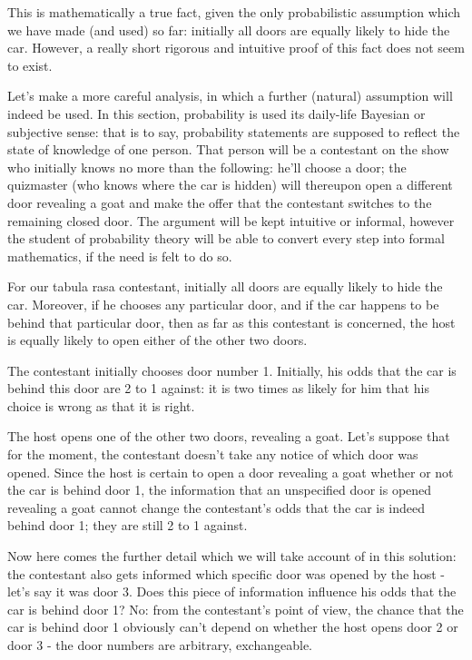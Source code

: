 This is mathematically a true fact, given the only probabilistic assumption which we have made (and used) so far: initially all doors are equally likely to hide the car. However, a really short rigorous and intuitive proof of this fact does not seem to exist.

Let's make a more careful analysis, in which a further (natural) assumption will indeed be used. In this section, probability is used its daily-life Bayesian or subjective sense: that is to say, probability statements are supposed to reflect the state of knowledge of one person. That person will be a contestant on the show who initially knows no more than the following: he'll choose a door; the quizmaster (who knows where the car is hidden) will thereupon open a different door revealing a goat and make the offer that the contestant switches to the remaining closed door. The argument will be kept intuitive or informal, however the student of probability theory will be able to convert every step into formal mathematics, if the need is felt to do so.

For our tabula rasa contestant, initially all doors are equally likely to hide the car. Moreover, if he chooses any particular door, and if the car happens to be behind that particular door, then as far as this contestant is concerned, the host is equally likely to open either of the other two doors.

The contestant initially chooses door number 1. Initially, his odds that the car is behind this door are 2 to 1 against: it is two times as likely for him that his choice is wrong as that it is right.

The host opens one of the other two doors, revealing a goat. Let's suppose that for the moment, the contestant doesn't take any notice of which door was opened. Since the host is certain to open a door revealing a goat whether or not the car is behind door 1, the information that an unspecified door is opened revealing a goat cannot change the contestant's odds that the car is indeed behind door 1; they are still 2 to 1 against.

Now here comes the further detail which we will take account of in this solution: the contestant also gets informed which specific door was opened by the host - let's say it was door 3. Does this piece of information influence his odds that the car is behind door 1? No: from the contestant's point of view, the chance that the car is behind door 1 obviously can't depend on whether the host opens door 2 or door 3 - the door numbers are arbitrary, exchangeable.

